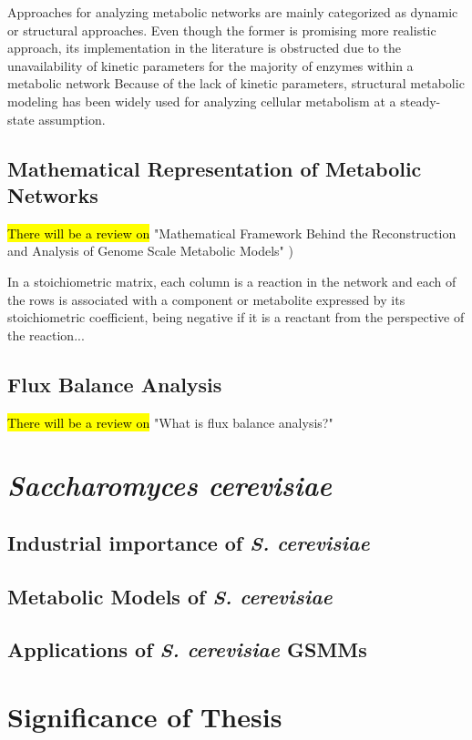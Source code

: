 Approaches for analyzing metabolic networks are mainly categorized as dynamic or structural approaches. Even though the former is promising more realistic approach, its implementation in the literature is obstructed due to the unavailability of kinetic parameters for the majority of enzymes within a metabolic network \cite{machado2014systematic, ramkrishna2012dynamic} Because of the lack of kinetic parameters, structural metabolic modeling has been widely used for analyzing cellular metabolism at a steady-state assumption.

\subsection{Mathematical Representation of Metabolic Networks}
\hl{There will be a review on} "Mathematical Framework Behind the Reconstruction and Analysis of Genome Scale Metabolic Models" \cite{pinzon2018mathematical})

In a stoichiometric matrix, each column is a reaction in the network and each of the rows is associated with a component or metabolite expressed by its stoichiometric coefficient, being negative if it is a reactant from the perspective of the reaction...

\subsection{Flux Balance Analysis}
\hl{There will be a review on} "What is flux balance analysis?" \cite{orth2010flux}

\section{\emph{Saccharomyces cerevisiae}}
\subsection{Industrial importance of \emph{S. cerevisiae}}
\subsection{Metabolic Models of \emph{S. cerevisiae}}
\subsection{Applications of \emph{S. cerevisiae} GSMMs}

\section{Significance of Thesis}
